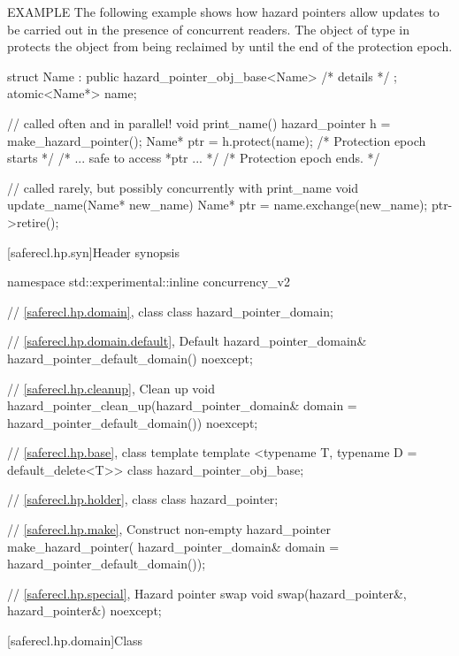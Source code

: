 EXAMPLE The following example shows how hazard pointers allow updates to be carried out in the presence of concurrent readers. The object of type  in  protects the object  from being reclaimed by  until the end of the protection epoch.

\begin{codeblock}
struct Name : public hazard_pointer_obj_base<Name> { /* details */ };
atomic<Name*> name;

// called often and in parallel!
void print_name() {
  hazard_pointer h = make_hazard_pointer();
  Name* ptr = h.protect(name); /* Protection epoch starts */
  /* ... safe to access *ptr ... */
} /* Protection epoch ends. */

// called rarely, but possibly concurrently with print_name
void update_name(Name* new_name) {
  Name* ptr = name.exchange(new_name);
  ptr->retire();
}
\end{codeblock}

[saferecl.hp.syn]{Header  synopsis}

\begin{codeblock}
namespace std::experimental::inline concurrency_v2 {
  // \ref{saferecl.hp.domain}, class 
  class hazard_pointer_domain;

  // \ref{saferecl.hp.domain.default}, Default 
  hazard_pointer_domain& hazard_pointer_default_domain() noexcept;

  // \ref{saferecl.hp.cleanup}, Clean up
  void hazard_pointer_clean_up(hazard_pointer_domain& domain = hazard_pointer_default_domain())
    noexcept;

  // \ref{saferecl.hp.base}, class template 
  template <typename T, typename D = default_delete<T>> class hazard_pointer_obj_base;

  // \ref{saferecl.hp.holder}, class 
  class hazard_pointer;

  // \ref{saferecl.hp.make}, Construct non-empty 
  hazard_pointer make_hazard_pointer(
    hazard_pointer_domain& domain = hazard_pointer_default_domain());

  // \ref{saferecl.hp.special}, Hazard pointer swap
  void swap(hazard_pointer&, hazard_pointer&) noexcept;
}
\end{codeblock}

[saferecl.hp.domain]{Class }

